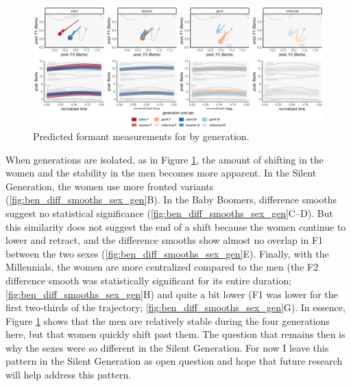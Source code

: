 \begin{figure}[p]
	\centering
	\includegraphics[angle = 90, origin = c, height = \textwidth]{Figures/BEN/BEN_sex_panel_plot_wide.pdf}
	\caption[Predicted formant measurements for \ben by generation.]{Predicted formant measurements for \ben by generation.}
	\label{fig:BEN_sex_panel_plot_wide}
\end{figure}

When generations are isolated, as in Figure \ref{fig:BEN_sex_panel_plot_wide}, the amount of shifting in the women and the stability in the men becomes more apparent. In the Silent Generation, the women use more fronted variants (\ref{fig:ben_diff_smooths_sex_gen}B). In the Baby Boomers, difference smooths suggest no statistical significance (\ref{fig:ben_diff_smooths_sex_gen}C--D). But this similarity does not suggest the end of a shift because the women continue to lower and retract, and the difference smooths show almost no overlap in F1 between the two sexes (\ref{fig:ben_diff_smooths_sex_gen}E). Finally, with the Millennials, the women are more centralized compared to the men (the F2 difference smooth was statistically significant for its entire duration; \ref{fig:ben_diff_smooths_sex_gen}H) and quite a bit lower (F1 was lower for the first two-thirds of the trajectory; \ref{fig:ben_diff_smooths_sex_gen}G). In essence, Figure \ref{fig:BEN_sex_panel_plot_wide} shows that the men are relatively stable during the four generations here, but that women quickly shift past them. The question that remains then is why the sexes were so different in the Silent Generation. For now I leave this pattern in the Silent Generation as open question and hope that future research will help address this pattern.

